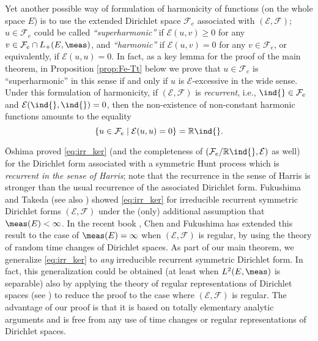Yet another possible way of formulation of harmonicity of functions (on the whole
space $E$) is to use the extended Dirichlet space $\mathcal{F}_{e}$ associated
with $(\mathcal{E},\mathcal{F})$; $u\in\mathcal{F}_{e}$ could be called
\emph{``superharmonic''} if $\mathcal{E}(u,v)\geq 0$ for any
$v\in\mathcal{F}_{e}\cap L_{+}(E,\meas)$, and
\emph{``harmonic''} if $\mathcal{E}(u,v)=0$ for any $v\in\mathcal{F}_{e}$,
or equivalently, if $\mathcal{E}(u,u)=0$.
In fact, as a key lemma for the proof of the main theorem,
in Proposition \ref{prop:Fe-Tt} below we prove that $u\in\mathcal{F}_{e}$ is ``superharmonic''
in this sense if and only if $u$ is $\mathcal{E}$-excessive in the wide sense.
Under this formulation of harmonicity,
if $(\mathcal{E},\mathcal{F})$ is \emph{recurrent}, i.e.,
$\ind{}\in\mathcal{F}_{e}$ and $\mathcal{E}(\ind{},\ind{})=0$,
then the non-existence of non-constant harmonic
functions amounts to the equality
\begin{equation}\label{eq:irr_ker}
\{u\in\mathcal{F}_{e}\mid\mathcal{E}(u,u)=0\}=\mathbb{R}\ind{}.
\end{equation}

\={O}shima \cite[Theorem 3.1]{Oshima:LMN82} proved \eqref{eq:irr_ker}
(and the completeness of $(\mathcal{F}_{e}/\mathbb{R}\ind{},\mathcal{E})$ as well)
for the Dirichlet form associated with a symmetric Hunt process which is
\emph{recurrent in the sense of Harris}; note that the recurrence in the sense of
Harris is stronger than the usual recurrence of the associated Dirichlet form.
Fukushima and Takeda \cite[Theorem 4.2.4]{FT} (see also \cite[Theorem 2.1.11]{CF})
showed \eqref{eq:irr_ker} for irreducible recurrent symmetric Dirichlet forms
$(\mathcal{E},\mathcal{F})$ under the (only) additional assumption that $\meas(E)<\infty$.
In the recent book \cite{CF}, Chen and Fukushima has extended this result
to the case of $\meas(E)=\infty$ when $(\mathcal{E},\mathcal{F})$ is regular,
by using the theory of random time changes of Dirichlet spaces.
As part of our main theorem, we generalize \eqref{eq:irr_ker} to \emph{any}
irreducible recurrent symmetric Dirichlet form. In fact, this generalization
could be obtained (at least when $L^{2}(E,\meas)$ is separable) also by applying
the theory of regular representations of Dirichlet spaces
(see \cite[Section A.4]{FOT}) to reduce the proof to the case where
$(\mathcal{E},\mathcal{F})$ is regular.
The advantage of our proof is that it is based on totally
elementary analytic arguments and is free from any use of time changes or
regular representations of Dirichlet spaces.

